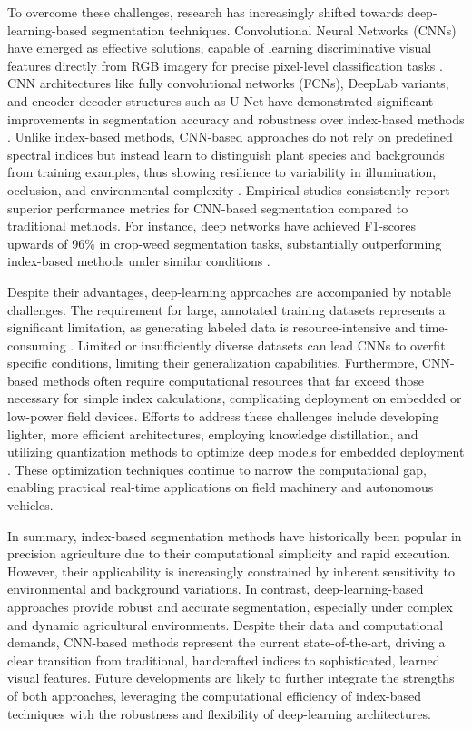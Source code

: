 \documentclass[agriculture,article,submit,pdftex,moreauthors]{Definitions/mdpi}
\begin{document}
To overcome these challenges, research has increasingly shifted towards deep-learning-based segmentation techniques. Convolutional Neural Networks (CNNs) have emerged as effective solutions, capable of learning discriminative visual features directly from RGB imagery for precise pixel-level classification tasks \cite{Kamilaris2018-to}. CNN architectures like fully convolutional networks (FCNs), DeepLab variants, and encoder-decoder structures such as U-Net have demonstrated significant improvements in segmentation accuracy and robustness over index-based methods \cite{Ronneberger2015-ye, Gao2023-nw}. Unlike index-based methods, CNN-based approaches do not rely on predefined spectral indices but instead learn to distinguish plant species and backgrounds from training examples, thus showing resilience to variability in illumination, occlusion, and environmental complexity \cite{Zhuang2018-px, Milioto2018-yb}. Empirical studies consistently report superior performance metrics for CNN-based segmentation compared to traditional methods. For instance, deep networks have achieved F1-scores upwards of 96\% in crop-weed segmentation tasks, substantially outperforming index-based methods under similar conditions \cite{Gao2023-nw, Milioto2018-yb}.

Despite their advantages, deep-learning approaches are accompanied by notable challenges. The requirement for large, annotated training datasets represents a significant limitation, as generating labeled data is resource-intensive and time-consuming \cite{Kamilaris2018-to}. Limited or insufficiently diverse datasets can lead CNNs to overfit specific conditions, limiting their generalization capabilities. Furthermore, CNN-based methods often require computational resources that far exceed those necessary for simple index calculations, complicating deployment on embedded or low-power field devices. Efforts to address these challenges include developing lighter, more efficient architectures, employing knowledge distillation, and utilizing quantization methods to optimize deep models for embedded deployment \cite{Wang2021-dh}. These optimization techniques continue to narrow the computational gap, enabling practical real-time applications on field machinery and autonomous vehicles.

In summary, index-based segmentation methods have historically been popular in precision agriculture due to their computational simplicity and rapid execution. However, their applicability is increasingly constrained by inherent sensitivity to environmental and background variations. In contrast, deep-learning-based approaches provide robust and accurate segmentation, especially under complex and dynamic agricultural environments. Despite their data and computational demands, CNN-based methods represent the current state-of-the-art, driving a clear transition from traditional, handcrafted indices to sophisticated, learned visual features. Future developments are likely to further integrate the strengths of both approaches, leveraging the computational efficiency of index-based techniques with the robustness and flexibility of deep-learning architectures.
\end{document}
